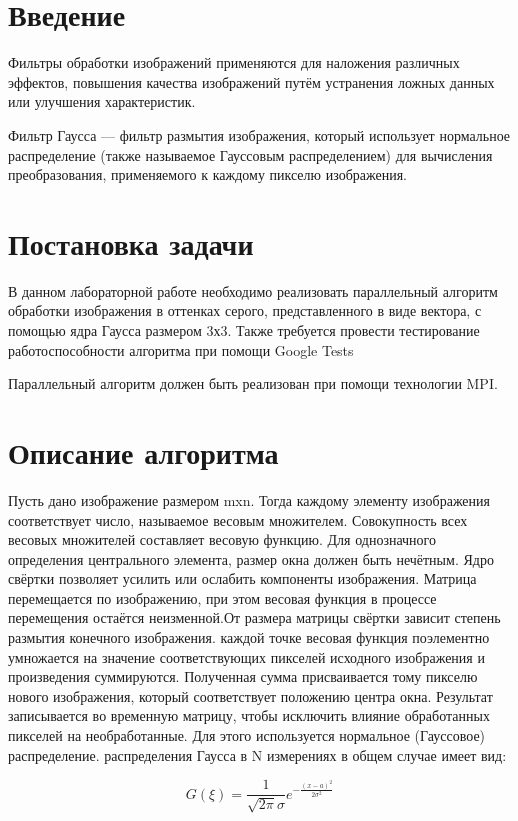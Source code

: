 \documentclass{report}
\begin{document}
\setcounter{page}{2}

\tableofcontents
\newpage

\section*{Введение}
\par Фильтры обработки изображений применяются для наложения различных эффектов, повышения качества изображений путём устранения ложных данных или улучшения характеристик.
\par
Фильтр Гаусса — фильтр размытия изображения, который использует нормальное распределение (также называемое Гауссовым распределением) для вычисления преобразования, применяемого к каждому пикселю изображения. 
\newpage

\section*{Постановка задачи}
\par В данном лабораторной работе необходимо реализовать параллельный алгоритм обработки изображения в оттенках серого, представленного в виде вектора, с помощью ядра Гаусса размером 3х3. Также требуется провести тестирование работоспособности алгоритма при помощи Google Tests
\par Параллельный алгоритм должен быть реализован при помощи технологии MPI.
\newpage

\section*{Описание алгоритма}
Пусть дано изображение размером mxn.  
Тогда каждому элементу изображения соответствует число, называемое весовым множителем. Совокупность всех весовых множителей составляет весовую функцию.
Для однозначного определения центрального элемента, размер окна должен быть нечётным. Ядро свёртки позволяет усилить или ослабить компоненты изображения. Матрица перемещается по изображению, при этом весовая функция в процессе перемещения остаётся неизменной.От размера матрицы свёртки зависит степень размытия конечного изображения.
 каждой точке весовая функция поэлементно умножается на значение соответствующих пикселей исходного изображения и произведения суммируются. Полученная сумма присваивается тому пикселю нового изображения, который соответствует положению центра окна. Результат записывается во временную матрицу, чтобы исключить влияние обработанных пикселей на необработанные. Для этого используется нормальное (Гауссовое) распределение. 
 распределения Гаусса в N измерениях в общем случае имеет вид:
\par $$G(\xi) = \frac{1}{\sqrt{2\pi }\sigma }e^{-\frac{(x-a)^2}{2\sigma ^2}}$$
\end{document}
